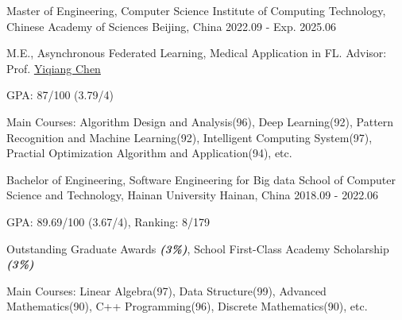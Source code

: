 

\begin{cventries}

\cventry
{Master of Engineering, Computer Science} %
{Institute of Computing Technology, Chinese Academy of Sciences} %
{Beijing, China} %
{2022.09 - Exp. 2025.06} %
{
  \begin{cvitems} %
    \item {M.E., Asynchronous Federated Learning, Medical Application in FL. Advisor: Prof. \href{https://www.ict.cas.cn/sourcedb_ict_cas/cn/jssrck/200909/t20090917_2496596.html}{Yiqiang Chen}}
    \item {GPA: 87/100 (3.79/4)}
    \item {Main Courses: Algorithm Design and Analysis(96), Deep Learning(92), Pattern Recognition and Machine Learning(92), Intelligent Computing System(97), Practial Optimization Algorithm and Application(94), etc.}
  \end{cvitems}
}

\cventry
{Bachelor of Engineering, Software Engineering for Big data} %
{School of Computer Science and Technology, Hainan University} %
{Hainan, China} %
{2018.09 - 2022.06} %
{
  \begin{cvitems} %
    \item {GPA: 89.69/100 (3.67/4), Ranking: 8/179} %
    \item {Outstanding Graduate Awards \textit{\textbf{(3\%)}}, School First-Class Academy Scholarship \textit{\textbf{(3\%)}}}
    \item {Main Courses: Linear Algebra(97), Data Structure(99), Advanced Mathematics(90), C++ Programming(96), Discrete Mathematics(90), etc.}
  \end{cvitems}
}

\end{cventries}
